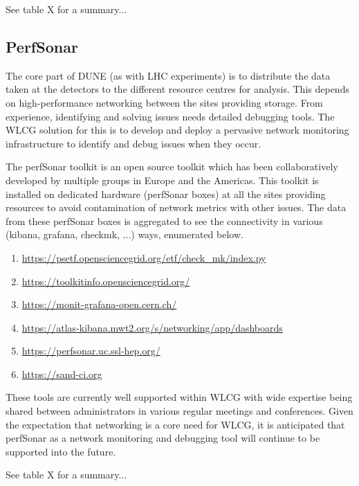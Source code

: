 \documentclass[../main-v1.tex]{subfiles}
\begin{document}
See table X for a summary... 

\subsection{PerfSonar}

The core part of DUNE (as with LHC experiments) is to distribute the data taken at the detectors to the different resource centres for analysis. This depends on high-performance networking between the sites providing storage. From experience, identifying and solving issues needs detailed debugging tools. The WLCG solution for this is to develop and deploy a pervasive network monitoring infrastructure to identify and debug issues when they occur.

The perfSonar toolkit is an open source toolkit which has been collaboratively developed by multiple groups in Europe and the Americas. This toolkit is installed on dedicated hardware (perfSonar boxes) at all the sites providing resources to avoid contamination of network metrics with other issues. The data from these perfSonar boxes is aggregated to see the connectivity in various (kibana, grafana, checkmk, ...) ways, enumerated below.

\begin{enumerate}
    \item \url{https://psetf.opensciencegrid.org/etf/check_mk/index.py}
    \item \url{https://toolkitinfo.opensciencegrid.org/}
    \item \url{https://monit-grafana-open.cern.ch/}
    \item \url{https://atlas-kibana.mwt2.org/s/networking/app/dashboards}
    \item \url{https://perfsonar.uc.ssl-hep.org/}
    \item \url{https://sand-ci.org}
\end{enumerate}

These tools are currently well supported within WLCG with wide expertise being shared between administrators in various regular meetings and conferences. Given the expectation that networking is a core need for WLCG, it is anticipated that perfSonar as a network monitoring and debugging tool will continue to be supported into the future.

See table X for a summary... 

\end{document}

